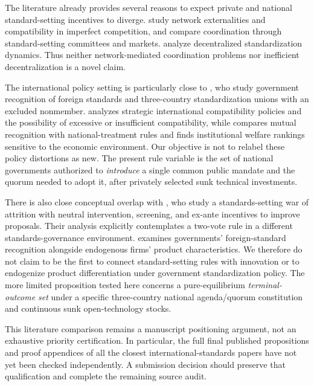 The literature already provides several reasons to
expect private and national standard-setting
incentives to diverge. \citet{KatzShapiro1985}
study network externalities and compatibility in
imperfect competition, and \citet{FarrellSaloner1988}
compare coordination through standard-setting
committees and markets. \citet{AuriolBenaim2000}
analyze decentralized standardization dynamics.
Thus neither network-mediated coordination problems
nor inefficient decentralization is a novel claim.

The international policy setting is particularly
close to \citet{GandalShy2001}, who study
government recognition of foreign standards and
three-country standardization unions with an excluded
nonmember. \citet{Klimenko2009} analyzes
strategic international compatibility policies
and the possibility of excessive or insufficient
compatibility, while \citet{Costinot2008} compares
mutual recognition with national-treatment rules
and finds institutional welfare rankings sensitive
to the economic environment. Our objective is
not to relabel these policy distortions as new.
The present rule variable is the set of national
governments authorized to \emph{introduce} a single
common public mandate and the quorum needed to
adopt it, after privately selected sunk
technical investments.

There is also close conceptual overlap with
\citet{FarrellSimcoe2012}, who study a
standards-setting war of attrition with neutral
intervention, screening, and ex-ante incentives
to improve proposals. Their analysis explicitly
contemplates a two-vote rule in a different
standards-governance environment.
\citet{Ruiz2004} examines governments'
foreign-standard recognition alongside
endogenous firms' product characteristics.
We therefore do not claim to be the first
to connect standard-setting rules with
innovation or to endogenize product differentiation
under government standardization policy.
The more limited proposition tested here concerns
a pure-equilibrium \emph{terminal-outcome set}
under a specific three-country national
agenda/quorum constitution and continuous
sunk open-technology stocks.

This literature comparison remains a manuscript
positioning argument, not an exhaustive
priority certification. In particular,
the full final published propositions and
proof appendices of all the closest
international-standards papers have not yet
been checked independently.
A submission decision should preserve
that qualification and complete the
remaining source audit.


